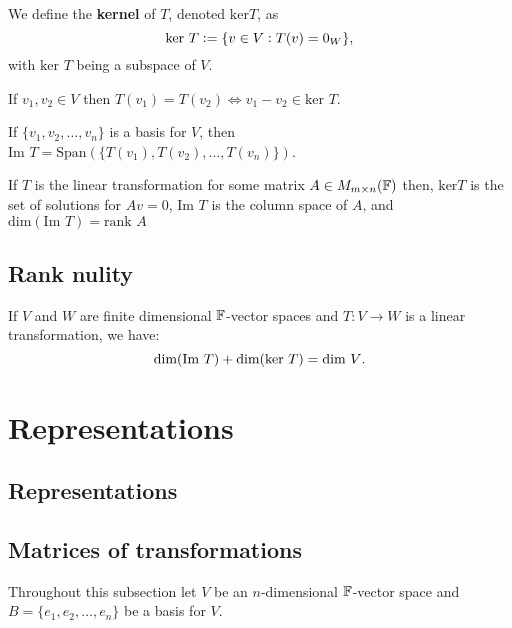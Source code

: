 \begin{definition}[Kernel]
    We define the \textbf{kernel} of $T$, denoted $\text{ker}T$, as \[
        \text{ker }T := \{v\in V: T(v)=0_W\}
        \textcolor{black}{,}
    \]
    with $\text{ker }T$ being a subspace of $V$.
\end{definition}

\begin{theorem}
    If $v_1,v_2\in V$ then $T(v_1)=T(v_2) \iff v_1-v_2\in\text{ker }T$.
\end{theorem}

\begin{theorem}
    If $\{v_1,v_2,\ldots,v_n\}$ is a basis for $V$, then $\text{Im }T = \text{Span}(\{T(v_1),T(v_2),\ldots,T(v_n)\})$.
\end{theorem}

\begin{remark}
    If $T$ is the linear transformation for some matrix $A\in M_{m\times n}(\mathbb{F})$ then, $\text{ker} T$ is the set of solutions for $Av=0$, $\text{Im }T$ is the column space of $A$, and $\text{dim}(\text{Im }T)=\text{rank }A$
\end{remark}

\subsection{Rank nulity}

\begin{theorem}
    If $V$ and $W$ are finite dimensional $\mathbb{F}$-vector spaces and $T:V\rightarrow W$ is a linear transformation, we have: \[
        \text{dim}(\text{Im }T) + \text{dim}(\text{ker }T) = \text{dim }V
    \textcolor{black}{.}
    \]
\end{theorem}

\section{Representations}

\subsection{Representations}

\subsection{Matrices of transformations}
Throughout this subsection let $V$ be an $n$-dimensional $\mathbb{F}$-vector space and $B=\{e_1, e_2, \ldots, e_n\}$ be a basis for $V$.

